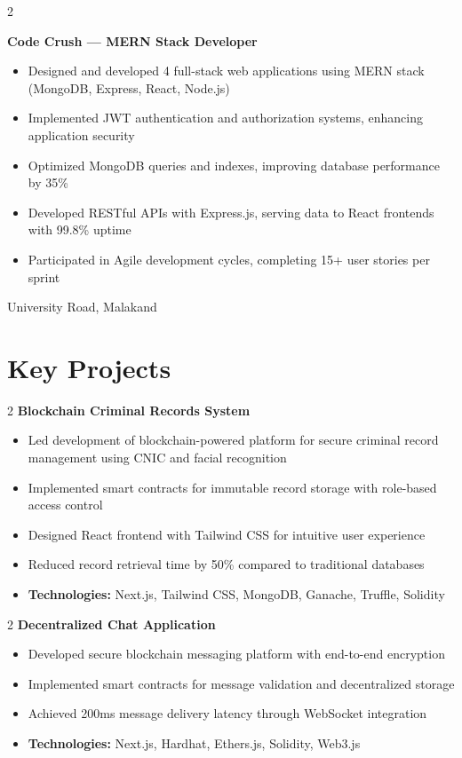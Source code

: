\documentclass[10pt, letterpaper]{article}
\newenvironment{highlights}{
    \begin{itemize}[
        topsep=0.10 cm,
        parsep=0.10 cm,
        partopsep=0pt,
        itemsep=0pt,
        leftmargin=0.4 cm + 10pt
    ]
}{
    \end{itemize}
}
\newenvironment{twocolentry}[2][]{
    \onecolentry
    \def\secondColumn{#2}
    \setcolumnwidth{\fill, 4.5 cm}
    \begin{paracol}{2}
}{
    \switchcolumn \raggedleft \secondColumn
    \end{paracol}
    \endonecolentry
}
\let\hrefWithoutArrow\href
\renewcommand{\href}[2]{\hrefWithoutArrow{#1}{\ifthenelse{\equal{#2}{}}{ }{#2 }\raisebox{.15ex}{\footnotesize \faExternalLink*}}}
\begin{document}
\begin{twocolentry}{
		University Road, Malakand \\
	}
	\textbf{Code Crush — MERN Stack Developer}
	\begin{highlights}
		\item Designed and developed 4 full-stack web applications using MERN stack (MongoDB, Express, React, Node.js)
		\item Implemented JWT authentication and authorization systems, enhancing application security
		\item Optimized MongoDB queries and indexes, improving database performance by 35\%
		\item Developed RESTful APIs with Express.js, serving data to React frontends with 99.8\% uptime
		\item Participated in Agile development cycles, completing 15+ user stories per sprint
	\end{highlights}
\end{twocolentry}

\section{Key Projects}

\begin{twocolentry}{
		\href{https://github.com/rogueinnovator/blockchain-based-criminal-information-managment-system}{GitHub}
	}{
		\textbf{Blockchain Criminal Records System}
	}
	\begin{highlights}
		\item Led development of blockchain-powered platform for secure criminal record management using CNIC and facial recognition
		\item Implemented smart contracts for immutable record storage with role-based access control
		\item Designed React frontend with Tailwind CSS for intuitive user experience
		\item Reduced record retrieval time by 50\% compared to traditional databases
		\item \textbf{Technologies:} Next.js, Tailwind CSS, MongoDB, Ganache, Truffle, Solidity
	\end{highlights}
\end{twocolentry}

\begin{twocolentry}{
		\href{https://github.com/rogueinnovator/d-chat-app}{GitHub}
	}{
		\textbf{Decentralized Chat Application}
	}
	\begin{highlights}
		\item Developed secure blockchain messaging platform with end-to-end encryption
		\item Implemented smart contracts for message validation and decentralized storage
		\item Achieved 200ms message delivery latency through WebSocket integration
		\item \textbf{Technologies:} Next.js, Hardhat, Ethers.js, Solidity, Web3.js
	\end{highlights}
\end{twocolentry}
\end{document}
